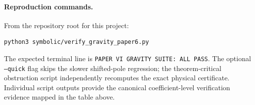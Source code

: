 \documentclass[11pt]{article}
\theoremstyle{definition}
\theoremstyle{remark}
\begin{document}
\paragraph{Reproduction commands.}
From the repository root for this project:
\begin{verbatim}
python3 symbolic/verify_gravity_paper6.py
\end{verbatim}
The expected terminal line is
\texttt{PAPER VI GRAVITY SUITE: ALL PASS}.  The optional
\texttt{--quick} flag skips the slower shifted-pole regression; the
theorem-critical obstruction script independently recomputes the exact
physical certificate.  Individual script outputs provide the canonical
coefficient-level verification evidence mapped in the table above.
\end{document}
